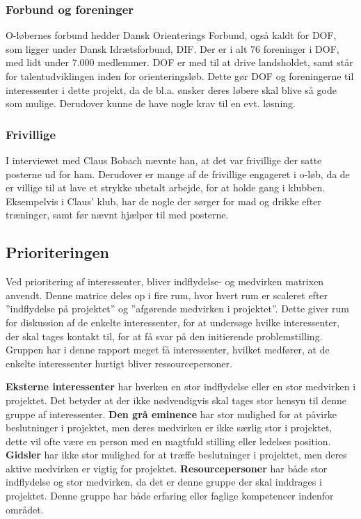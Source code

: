 \subsubsection{Forbund og foreninger}
O-løbernes forbund hedder Dansk Orienterings Forbund, også kaldt for DOF, som ligger under Dansk Idrætsforbund, DIF. Der er i alt 76 foreninger i DOF, med lidt under 7.000 medlemmer\citep{DIF}. DOF er med til at drive landsholdet, samt står for talentudviklingen inden for orienteringsløb. Dette gør DOF og foreningerne til interessenter i dette projekt, da de bl.a. ønsker deres løbere skal blive så gode som mulige. Derudover kunne de have nogle krav til en evt. løsning. \citep{DIF}

\subsubsection{Frivillige}
I interviewet med Claus Bobach nævnte han, at det var frivillige der satte posterne ud for ham. Derudover er mange af de frivillige engageret i o-løb, da de er villige til at lave et strykke ubetalt arbejde, for at holde gang i klubben. Eksempelvis i Claus' klub, har de nogle der sørger for mad og drikke efter træninger, samt før nævnt hjælper til med posterne.


\subsection{Prioriteringen}
Ved prioritering af interessenter, bliver indflydelse- og medvirken matrixen anvendt. Denne matrice deles op i fire rum, hvor hvert rum er scaleret efter ”indflydelse på projektet” og ”afgørende medvirken i projektet”. Dette giver rum for diskussion af de enkelte interessenter, for at undersøge hvilke interessenter, der skal tages kontakt til, for at få svar på den initierende problemstilling.
Gruppen har i denne rapport meget få interessenter, hvilket medfører, at de enkelte interessenter hurtigt bliver ressourcepersoner.

\textbf{Eksterne interessenter} har hverken en stor indflydelse eller en stor medvirken i projektet. Det betyder at der ikke nødvendigvis skal tages stor hensyn til denne gruppe af interessenter.\newline 
\textbf{Den grå eminence} har stor mulighed for at påvirke beslutninger i projektet, men deres medvirken er ikke særlig stor i projektet, dette vil ofte være en person med en magtfuld stilling eller ledelses position. \newline
\textbf{Gidsler} har ikke stor mulighed for at træffe beslutninger i projektet, men deres aktive medvirken er vigtig for projektet.\newline
\textbf{Resourcepersoner} har både stor indflydelse og stor medvirken, da det er denne gruppe der skal inddrages i projektet. Denne gruppe har både erfaring eller faglige kompetencer indenfor området. \newline
  
